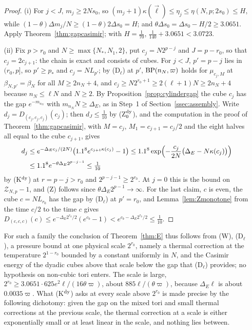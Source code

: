 \begin{proof}
(i) For $j<J$, $m_j\ge2Ns_0$, so $(m_j+1)\kappa(\vec\ell)\le\eta_j\le
\eta(N,p;2s_0)\le H$, while $(1-\theta)\Delta m_j/N\ge(1-\theta)2\Delta s_0
=H$; and $\theta\Delta s_0=\Delta s_0-H/2\ge3.0651$. Apply
Theorem~\ref{thm:gapcasimir}; with $H=\frac1{70}$, $\frac1{140}+3.0651<
3.0723$.

(ii) Fix $p>r_0$ and $N\ge\max\{N_*,N_1,2\}$, put $c_j=N2^{p-j}$ and $J=p-
r_0$, so that $c_j=2c_{j+1}$: the chain is exact and consists of cubes. For
$j<J$, $p'=p-j$ lies in $(r_0,p]$, so $p'\ge p_*$ and $c_j=NL_{p'}$; by
(D$_\ell$) at $p'$, $\mathrm{BP}(n_N,\varpi)$ holds for $\mu_{c_j,M}$ at
$\beta_{N,p'}=\beta_N$ for all $M\ge2n_N+4$, and $c_j\ge N2^{r_0+1}\ge
2(\ell+1)N\ge2n_N+4$ because $n_N\le\ell N$ and $N\ge2$. By
Proposition~\ref{prop:cylindergap} the cube $c_j$ has the gap $e^{-m_{n_N}}$
with $m_{n_N}N\ge\Delta_E$, as in Step~1 of Section~\ref{ssec:assembly}.
Write $d_j=D_{(c_j,c_j,c_j)}(c_j)$; then $d_J\le\frac1{10}$ by
(Z$_0^{\rm dy}$), and the computation in the proof of
Theorem~\ref{thm:gapcasimir}, with $M=c_j$, $M_1=c_{j+1}=c_j/2$ and the
eight halves all equal to the cube $c_{j+1}$, gives
\begin{align*}
d_j&\le e^{-\Delta_Ec_j/(2N)}\bigl(1.1^8e^{c_{j+1}\kappa(c_j)}-1\bigr)\le
1.1^8\exp\Bigl(-\frac{c_j}{2N}\bigl(\Delta_E-N\kappa(c_j)\bigr)\Bigr)\\
&\le1.1^8e^{-\theta\Delta_E2^{p-j-1}}\le\tfrac1{10}
\end{align*}
by (K$^{\rm dy}$) at $r=p-j>r_0$ and $2^{p-j-1}\ge2^{r_0}$. At $j=0$ this is
the bound on $\mathcal Z_{N,p}-1$, and (Z) follows since $\theta\Delta_E
2^{p-1}\to\infty$. For the last claim, $c$ is even, the cube $c=NL_{r_0}$ has
the gap by (D$_\ell$) at $p'=r_0$, and Lemma~\ref{lem:Zmonotone} from the
time $c/2$ to the time $c$ gives $D_{(c,c,c)}(c)\le e^{-\Delta_E2^{r_0}/2}
(e^{c_b}-1)<e^{c_b-\Delta_E2^{r_0}/2}\le\frac1{10}$.
\end{proof}

For such a family the conclusion of Theorem~\ref{thm:E} thus follows from
\textup{(W)}, \textup{(D$_\ell$)}, a pressure bound at one physical scale
$2^{r_0}$, namely a thermal correction at the temperature $2^{1-r_0}$
bounded by a constant uniformly in $N$, and the Casimir energy of the
dyadic cubes above that scale below the gap that \textup{(D$_\ell$)}
provides; no hypothesis on non-cubic tori enters. The scale is large,
$2^{r_0}\ge3.0651\cdot625e^2\ell/(16\theta\varpi)$, about $885\ell/(\theta
\varpi)$, because $\Delta_E\ell$ is about $0.0035\varpi$. What (K$^{\rm dy}$)
asks at every scale above $2^{r_0}$ is made precise by the following
dichotomy: given the gap on the mixed tori and small thermal corrections at
the previous scale, the thermal correction at a scale is either
exponentially small or at least linear in the scale, and nothing lies
between.

